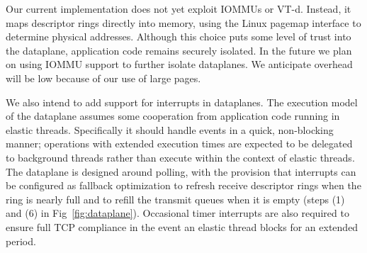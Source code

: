 \begin{comment}
  \myparagraph{Using interrupts as a fallback:} Some applications
  service requests that require extended intervals of compute time. We
  intend for these requests to be delegated to from elastic threads to
  background threads in order to ensure that elastic threads remain
  responsive.  However, \ix can also be modified to better tolerate
  unanticipated delays during application processing in elastic
  threads.  One option would be to use interrupts as a fallback
  mode. On the receive side, the NIC would fire an interrupt whenever
  the recieve descriptor ring is almost full. The dataplane could then
  move packets from the receive ring to a software structure, averting
  buffer underrun. On the transmit side, NIC would fire an interrupt
  whenever the transmit ring becomes empty so that it can be
  refilled. Such an interrupt would only need to be armed when there
  is additional transmit data pending. A desirable property of this
  approach is that neither interrupt would be triggered as long as
  elastic threads are sufficiently responsive, but if an elastic
  thread misbehaves, the \ix dataplane would be able to regain control
  and catch up on network processing.
\end{comment}


 Our current
implementation does not yet exploit IOMMUs or VT-d. Instead, it maps
descriptor rings directly into \ix memory, using the Linux pagemap
interface to determine physical addresses.  Although this choice puts
some level of trust into the \ix dataplane, application code remains
securely isolated. In the future we plan on using IOMMU support to
further isolate \ix dataplanes. We anticipate overhead will be low
because of our use of large pages.


We also intend to add support for interrupts in \ix dataplanes. The
execution model of the \ix dataplane assumes some cooperation from
application code running in elastic threads.  Specifically it should
handle events in a quick, non-blocking manner; operations with
extended execution times are expected to be delegated to background
threads rather than execute within the context of elastic threads.
The \ix dataplane is designed around polling, with the provision that
interrupts can be configured as fallback optimization to refresh
receive descriptor rings when the ring is nearly full and to refill
the transmit queues when it is empty (steps (1) and (6) in
Fig~\ref{fig:dataplane}). Occasional timer interrupts are also
required to ensure full TCP compliance in the event an elastic thread
blocks for an extended period.

